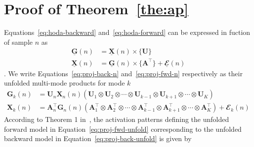 \documentclass[twocolumn]{article}
\newcommand{\ten}[1]{\underline{\mathbf{#1}}} %
\newcommand{\mat}[1]{\mathbf{#1}} %
\newcommand{\mmpr}[1]{\times\{#1\}} %
\begin{document}
\printbibliography

\appendix
\section{Proof of Theorem~\ref{the:ap}}

Equations~\ref{eq:hoda-backward} and~\ref{eq:hoda-forward} can be expressed in fuction
of sample $n$ as
\begin{subequations}
	\label{eq:proj-n}
	\begin{align}
		\ten{G}(n) & = \ten{X}(n)\mmpr{\mat{U}}
		\label{eq:proj-back-n}                                                   \\
		\ten{X}(n) & = \ten{G}(n)\mmpr{\mat{A}^\intercal}+\ten{\mathbfcal{E}}(n)
		\label{eq:proj-fwd-n}
	\end{align}
\end{subequations}.
We write Equations~\ref{eq:proj-back-n} and~\ref{eq:proj-fwd-n} respectively
as their unfolded multi-mode products for mode $k$
\begin{subequations}
	\label{eq:proj-unfold}
	\begin{align}
		\mat{G}_k(n) & =
		\mat{U}_n\mat{X}_n(n)\left(\mat{U}_1\otimes\mat{U}_2\otimes\cdots\otimes\mat{U}_{k-1}\otimes\mat{U}_{k+1}\otimes\cdots\otimes\mat{U}_K\right)
		\label{eq:proj-back-unfold} \\
		\mat{X}_k(n) & =
		\mat{A}_n^\intercal\mat{G}_n(n)\left(\mat{A}^\intercal_1\otimes\mat{A}^\intercal_2\otimes\cdots\otimes\mat{A}^\intercal_{k-1}\otimes\mat{A}^\intercal_{k+1}\otimes\cdots\otimes\mat{A}^\intercal_K\right)
		+ \mat{\mathbfcal{E}}_k(n)
		\label{eq:proj-fwd-unfold}
	\end{align}
\end{subequations}
According to Theorem 1 in~\cite{Haufe2014}, the activation patterns defining the
unfolded forward model in Equation~\ref{eq:proj-fwd-unfold} corresponding to the
unfolded backward model in Equation~\ref{eq:proj-back-unfold} is given by
\end{document}
